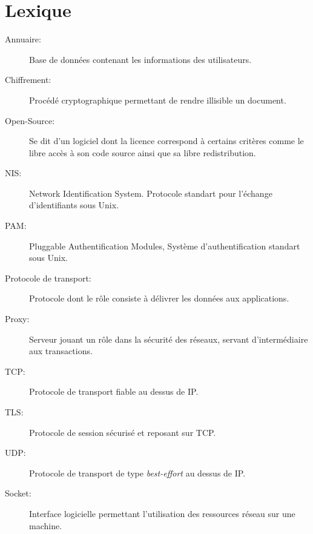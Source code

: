 \section*{Lexique}

\begin{description}
	\item [Annuaire:] Base de données contenant les informations des utilisateurs.
	\item [Chiffrement:] Procédé cryptographique permettant de rendre illisible un document.
	\item [Open-Source:] Se dit d'un logiciel dont la licence correspond à certains critères comme le libre accès à son code source ainsi que sa libre redistribution.
	\item [NIS:] Network Identification System. Protocole standart pour l'échange d'identifiants sous Unix.
	\item [PAM:] Pluggable Authentification Modules, Système d'authentification standart sous Unix.
	\item [Protocole de transport:] Protocole dont le rôle consiste à délivrer les données aux applications.
	\item [Proxy:] Serveur jouant un rôle dans la sécurité des réseaux, servant d'intermédiaire aux transactions.
	\item [TCP:] Protocole de transport fiable au dessus de IP.
	\item [TLS:] Protocole de session sécurisé et reposant sur TCP.
	\item [UDP:] Protocole de transport de type \textit{best-effort} au dessus de IP.
	\item [Socket:] Interface logicielle permettant l'utilisation des ressources réseau sur une machine.
\end{description}

\pagebreak
